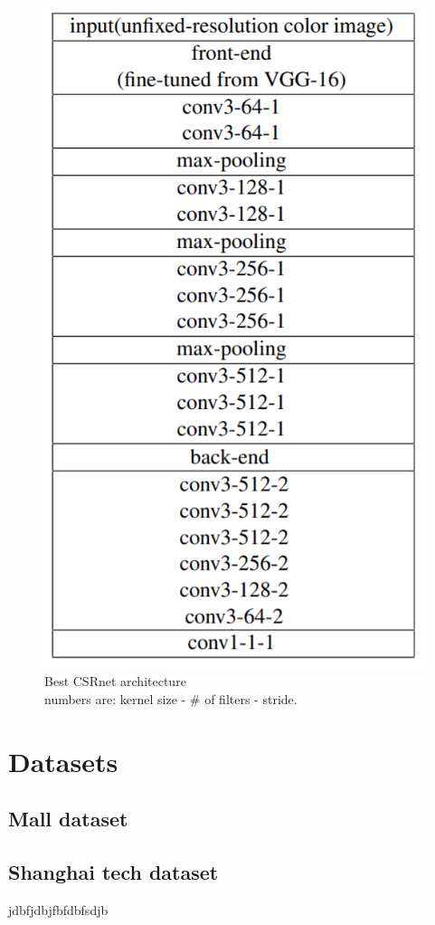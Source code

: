 \documentclass[10pt,twocolumn,letterpaper]{article}
\begin{document}
\begin{figure}[h!]
	\includegraphics[width=0.5\columnwidth]{pics/CSRnet.png}
	\centering
	\caption{Best CSRnet architecture\\ numbers are: kernel size - \# of filters - stride.}
	\centering
	\label{fig:CSRnet}
\end{figure}



\section{Datasets}
\subsection{Mall dataset}
\subsection{Shanghai tech dataset}

jdbfjdbjfbfdbfsdjb

\printbibliography

%
%
\end{document}
